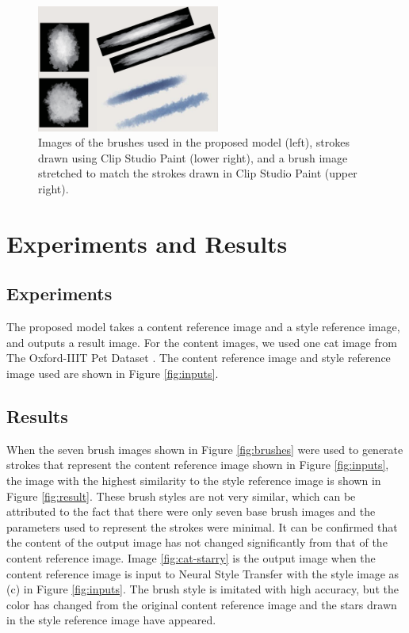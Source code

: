 \documentclass{mva_style}
\begin{document}
\begin{figure}[t]
  \centering
  \includegraphics[width=60mm]{resource/brush_discussion.eps}
  \caption{Images of the brushes used in the proposed model (left), 
  strokes drawn using Clip Studio Paint (lower right), 
  and a brush image stretched to match the strokes drawn in Clip Studio Paint (upper right).}
  \label{fig:discussion}
\end{figure}

\section{Experiments and Results}

\subsection{Experiments}
The proposed model takes a content reference image and a style reference image, 
and outputs a result image. For the content images, we used one cat image from 
The Oxford-IIIT Pet Dataset \cite{oxford-dataset} .
The content reference image and style reference image used are shown in Figure \ref{fig:inputs}.

\subsection{Results}
When the seven brush images shown in Figure \ref{fig:brushes} were used to 
generate strokes that represent the content reference image shown in Figure 
\ref{fig:inputs}, the image with the highest similarity to the style reference 
image is shown in Figure \ref{fig:result}. 
These brush styles are not very similar, which can be attributed to the fact 
that there were only seven base brush images and the parameters used to represent 
the strokes were minimal. It can be confirmed that the content of the output 
image has not changed significantly from that of the content reference image.
Image \ref{fig:cat-starry} is the output image when the content reference 
image is input to Neural Style Transfer \cite{ImageStyleTransfer} with the 
style image as (c) in Figure \ref{fig:inputs}. The brush style is imitated 
with high accuracy, but the color has changed from the original content 
reference image and the stars drawn in the style reference image have appeared.
\end{document}
